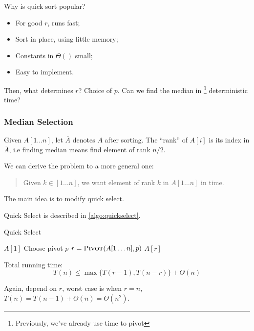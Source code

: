Why is quick sort popular?
\begin{itemize}
    \item For good $r$, runs fast;
    \item Sort in place, using little memory;
    \item Constants in $\Theta(  )$ small;
    \item Easy to implement.
\end{itemize}

Then, what determines $r$? Choice of $p$.
Can we find the median in 
\footnote{Previously, we've already use  time to pivot}
deterministic time?

\subsubsection{Median Selection}
Given $A[1 \ldots n]$, let $\overline{A}$ denotes $A$ after sorting.
The ``rank'' of $A[i]$ is its index in $\overline{A}$,
i.e finding median means find element of rank $n/2$.

We can derive the problem to a more general one:
\begin{quote}
    Given $k \in [1 \ldots n]$, we want element of rank $k$ in $A[1 \ldots n]$ in  time.
\end{quote}
The main idea is to modify quick select.

Quick Select is described in \cref{algo:quickselect}.

\begin{algorithm}[H]
    \caption{Quick Select}\label{algo:quickselect}
    \begin{algorithmic}
                \Return $A[1]$
            \Else
                \State Choose pivot $p$
                \State $r = \textsc{Pivot} (A[1 \ldots n], p)$
                    \Return {}
                    \Return {}
                \Else
                    \Return $A[r]$
                \EndIf
            \EndIf
        \EndProcedure
    \end{algorithmic}
\end{algorithm}

Total running time:
\[T(n) \leq \max\{T(r-1), T(n-r)\} + \Theta(n)\]

Again, depend on $r$, worst case is when $r=n$, $T(n) = T(n-1) + \Theta(n) = \Theta(n^2)$.

